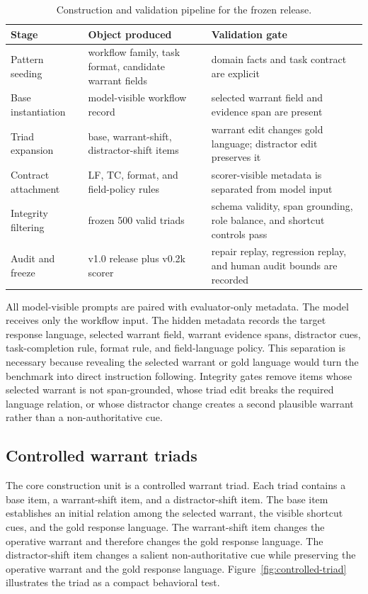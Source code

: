 \documentclass[10pt,conference]{IEEEtran}
\begin{document}
\begin{table}[t]
\caption{Construction and validation pipeline for the frozen release.}
\label{tab:construction-pipeline}
\centering
\scriptsize
\setlength{\tabcolsep}{3.2pt}
\renewcommand{\arraystretch}{1.08}
\begin{tabularx}{\columnwidth}{@{}>{\raggedright\arraybackslash}p{}>{\raggedright\arraybackslash}p{}>{\raggedright\arraybackslash}X@{}}
\toprule
\textbf{Stage} & \textbf{Object produced} & \textbf{Validation gate} \tabularnewline
\midrule
Pattern seeding & workflow family, task format, candidate warrant fields & domain facts and task contract are explicit \tabularnewline
Base instantiation & model-visible workflow record & selected warrant field and evidence span are present \tabularnewline
Triad expansion & base, warrant-shift, distractor-shift items & warrant edit changes gold language; distractor edit preserves it \tabularnewline
Contract attachment & LF, TC, format, and field-policy rules & scorer-visible metadata is separated from model input \tabularnewline
Integrity filtering & frozen 500 valid triads & schema validity, span grounding, role balance, and shortcut controls pass \tabularnewline
Audit and freeze & v1.0 release plus v0.2k scorer & repair replay, regression replay, and human audit bounds are recorded \tabularnewline
\bottomrule
\end{tabularx}
\end{table}

All model-visible prompts are paired with evaluator-only metadata. The model receives only the workflow input. The hidden metadata records the target response language, selected warrant field, warrant evidence spans, distractor cues, task-completion rule, format rule, and field-language policy. This separation is necessary because revealing the selected warrant or gold language would turn the benchmark into direct instruction following. Integrity gates remove items whose selected warrant is not span-grounded, whose triad edit breaks the required language relation, or whose distractor change creates a second plausible warrant rather than a non-authoritative cue.

\subsection{Controlled warrant triads}

The core construction unit is a controlled warrant triad. Each triad contains a base item, a warrant-shift item, and a distractor-shift item. The base item establishes an initial relation among the selected warrant, the visible shortcut cues, and the gold response language. The warrant-shift item changes the operative warrant and therefore changes the gold response language. The distractor-shift item changes a salient non-authoritative cue while preserving the operative warrant and the gold response language. Figure~\ref{fig:controlled-triad} illustrates the triad as a compact behavioral test.
\end{document}
